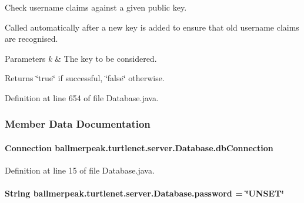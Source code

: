 Check username claims against a given public key. 

Called automatically after a new key is added to ensure that old username claims are recognised. 
\begin{DoxyParams}{Parameters}
{\em k} & The key to be considered. \\
\hline
\end{DoxyParams}
\begin{DoxyReturn}{Returns}
\char`\"{}true\char`\"{} if successful, \char`\"{}false\char`\"{} otherwise. 
\end{DoxyReturn}


Definition at line 654 of file Database.\-java.



\subsubsection{Member Data Documentation}
\hypertarget{classballmerpeak_1_1turtlenet_1_1server_1_1Database_afc619b6caae48aed2aef929243b00410}{
\paragraph[{db\-Connection}]{\setlength{\rightskip}{0pt plus 5cm}Connection ballmerpeak.\-turtlenet.\-server.\-Database.\-db\-Connection\hspace{0.3cm}{\ttfamily [private]}}}\label{classballmerpeak_1_1turtlenet_1_1server_1_1Database_afc619b6caae48aed2aef929243b00410}


Definition at line 15 of file Database.\-java.

\hypertarget{classballmerpeak_1_1turtlenet_1_1server_1_1Database_a6dc69ef37a9765547dfa556596f5ad3c}{
\paragraph[{password}]{\setlength{\rightskip}{0pt plus 5cm}String ballmerpeak.\-turtlenet.\-server.\-Database.\-password = \char`\"{}U\-N\-S\-E\-T\char`\"{}\hspace{0.3cm}{\ttfamily [private]}}}\label{classballmerpeak_1_1turtlenet_1_1server_1_1Database_a6dc69ef37a9765547dfa556596f5ad3c}


